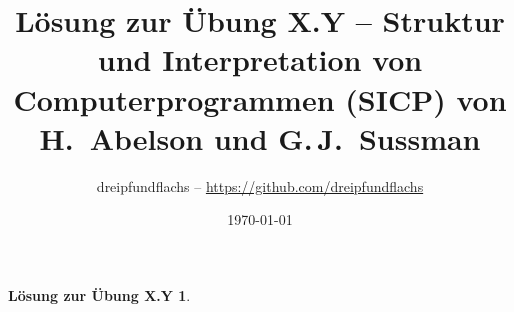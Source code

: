 \documentclass[a4paper,11pt,reqno]{amsart}
\theoremstyle{uremark}
\newtheorem*{loes}{L\"osung zur \"Ubung X.Y}
\begin{document}
\title[]{L\"osung zur \"Ubung X.Y -- Struktur und Interpretation von
Computerprogrammen (SICP) von H.~Abelson und G.\,J.~Sussman}
\author{dreipfundflachs --
\href{https://github.com/dreipfundflachs}{https://github.com/dreipfundflachs}}
\date{\today}
\maketitle

\begin{loes}

\end{loes}

    
\end{document}
